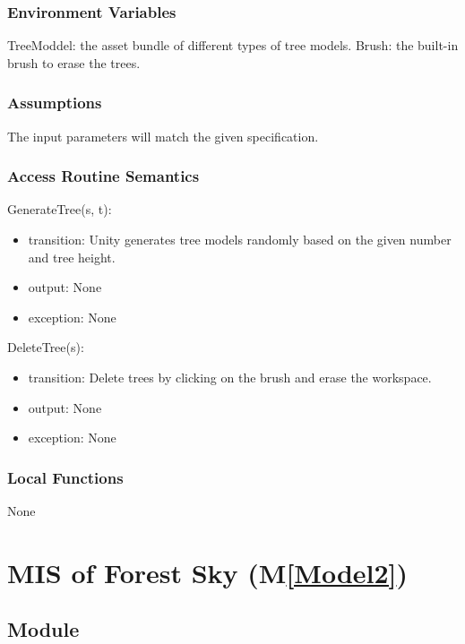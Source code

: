 \documentclass[12pt, titlepage]{article}
\newcommand{\mref}[1]{M\ref{#1}}
\begin{document}
\subsubsection{Environment Variables}

TreeModdel: the asset bundle of different types of tree models.
Brush: the built-in brush to erase the trees.

\subsubsection{Assumptions}

The input parameters will match the given specification.

\subsubsection{Access Routine Semantics}

\noindent GenerateTree(s, t):
\begin{itemize}
\item transition: Unity generates tree models randomly based on the given number and tree height.
\item output: None
\item exception: None
\end{itemize}

\noindent DeleteTree(s):
\begin{itemize}
\item transition: Delete trees by clicking on the brush and erase the workspace.
\item output: None
\item exception: None
\end{itemize}

\subsubsection{Local Functions}
None

\newpage

\section{MIS of Forest Sky (\mref{Model2})} 
\subsection{Module}
\end{document}
